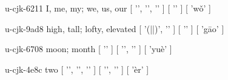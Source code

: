 \begin{multicols}{2}
\lettrine[lines=3]{\cjkgGlue{}}{}\begin{minipage}{0.8\linewidth} u-cjk-6211  I, me, my; we, us, our  [ '\cjkgGlue{}', '\cjkgGlue{}', '\cjkgGlue{}' ]  [ '\cjkgGlue{}' ]  [ 'wǒ' ] \end{minipage}

\lettrine[lines=3]{\cjkgGlue{}}{}\begin{minipage}{0.8\linewidth} u-cjk-9ad8  high, tall; lofty, elevated  [ '\cjkgGlue{}(\cjkgGlue{}|\cjkgGlue{}|\cjkgGlue{})', '\cjkgGlue{}' ]  [ '\cjkgGlue{}' ]  [ 'gāo' ] \end{minipage}

\lettrine[lines=3]{\cjkgGlue{}}{}\begin{minipage}{0.8\linewidth} u-cjk-6708  moon; month  [ '\cjkgGlue{}' ]  [ '\cjkgGlue{}', '\cjkgGlue{}' ]  [ 'yuè' ] \end{minipage}

\lettrine[lines=3]{\cjkgGlue{}}{}\begin{minipage}{0.8\linewidth} u-cjk-4e8c  two  [ '\cjkgGlue{}', '\cjkgGlue{}', '\cjkgGlue{}' ]  [ '\cjkgGlue{}', '\cjkgGlue{}' ]  [ 'èr' ] \end{minipage}


\end{multicols}

